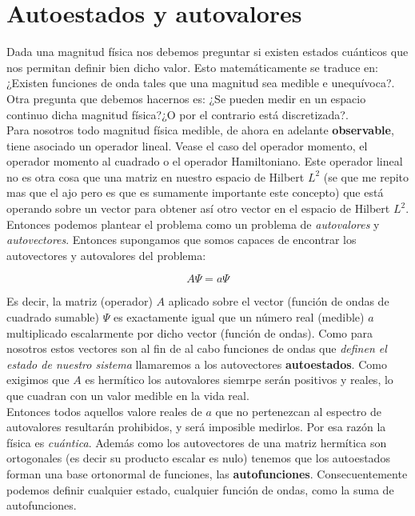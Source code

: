 \documentclass[12pt]{article}
\begin{document}
\section{Autoestados y autovalores}

Dada una magnitud física nos debemos preguntar si existen estados cuánticos que nos permitan definir bien dicho valor. Esto matemáticamente se traduce en: ¿Existen funciones de onda tales que una magnitud sea medible e unequívoca?. Otra pregunta que debemos hacernos es: ¿Se pueden medir en un espacio continuo dicha magnitud física?¿O por el contrario está discretizada?. \\

Para nosotros todo magnitud física medible, de ahora en adelante \textbf{observable}, tiene asociado un operador lineal. Vease el caso del operador momento, el operador momento al cuadrado o el operador Hamiltoniano. Este operador lineal no es otra cosa que una matriz en nuestro espacio de Hilbert $L^2$ (se que me repito mas que el ajo pero es que es sumamente importante este concepto) que está operando sobre un vector para obtener así otro vector en el espacio de Hilbert $L^2$. Entonces podemos plantear el problema como un problema de \textit{autovalores} y \textit{autovectores}. Entonces supongamos que somos capaces de encontrar los autovectores y autovalores del problema:

\begin{equation}
A \Psi = a \Psi
\end{equation}

Es decir, la matriz (operador) $A$ aplicado sobre el vector (función de ondas de cuadrado sumable) $\Psi$ es exactamente igual que un número real (medible) $a$ multiplicado escalarmente por dicho vector (función de ondas). Como para nosotros estos vectores son al fin de al cabo funciones de ondas que \textit{definen el estado de nuestro sistema} llamaremos a los autovectores \textbf{autoestados}. Como exigimos que $A$ es hermítico los autovalores siemrpe serán positivos y reales, lo que cuadran con un valor medible en la vida real. \\

Entonces todos aquellos valore reales de $a$ que no pertenezcan al espectro de autovalores resultarán prohibidos, y será imposible medirlos. Por esa razón la física es \textit{cuántica}. Además como los autovectores de una matriz hermítica son ortogonales (es decir su producto escalar es nulo) tenemos que los autoestados forman una base ortonormal de funciones, las \textbf{autofunciones}. Consecuentemente podemos definir cualquier estado, cualquier función de ondas, como la suma de autofunciones. \\
\end{document}
